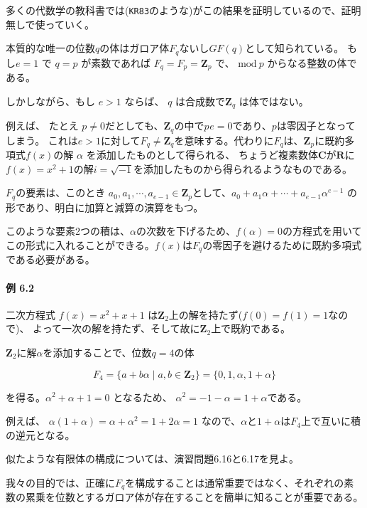 \documentclass[12pt,a4paper]{article}
\begin{document}
多くの代数学の教科書では(\texttt{KR83}のような)がこの結果を証明しているので、証明無しで使っていく。

本質的な唯一の位数$q$の体はガロア体$F_q$ないし$GF(q)$として知られている。
もし$ e = 1 $ で $q = p$ が素数であれば
$F_q = F_p = \mathbf{Z}_p$ で、 $\text{mod} \  p$
からなる整数の体である。

しかしながら、もし $e > 1$ ならば、 $q$
は合成数で$\mathbf{Z}_q$ は体ではない。

例えば、 たとえ $p \neq 0
$だとしても、$\mathbf{Z}_q$の中で$p^{}e =
0$であり、$p$は零因子となってしまう。 これは$e >
1$に対して$F_q
\neq \mathbf{Z}_q$を意味する。代わりに$F_q$は、$\mathbf{Z}_p$に既約多項式$f(x)$の解
$\alpha$ を添加したものとして得られる、
ちょうど複素数体$\mathbf{C}$が$\mathbf{R}$に$f(x) = x^2 + 1$の解$i = \sqrt{-1}$を添加したものから得られるようなものである。

$F_q$の要素は、このとき
$a_0, a_1, \cdots , a_{e-1} \in \mathbf{Z}_p$として、$a_0 + a_1 \alpha + \cdots + a_{e-1} \alpha^{e-1}$
の形であり、明白に加算と減算の演算をもつ。

このような要素2つの積は、$\alpha$の次数を下げるため、$f(\alpha) = 0$の方程式を用いてこの形式に入れることができる。$f(x)$は$F_q$の零因子を避けるために既約多項式である必要がある。

\paragraph{例 6.2}\label{ux4f8b-6.2}

二次方程式 $f(x) = x^2 + x + 1$
は$\mathbf{Z}_2$上の解を持たず($f(0) = f(1) = 1$なので)、
よって一次の解を持たず、そして故に$\mathbf{Z}_2$上で既約である。

$\mathbf{Z}_2$に解$\alpha$を添加することで、位数$q = 4$の体

\[F_4 = \lbrace a + b\alpha \mid a,b \in \mathbf{Z}_2 \rbrace = \lbrace 0, 1, \alpha , 1 + \alpha \rbrace\]

を得る。$\alpha^2 + \alpha + 1 = 0$ となるため、
$\alpha^2 = -1 - \alpha = 1 + \alpha$である。

例えば、 $\alpha (1 + \alpha) = \alpha + \alpha^2 = 1 + 2 \alpha = 1$
なので、$\alpha$と$1 + \alpha$は$F_4$上で互いに積の逆元となる。

似たような有限体の構成については、演習問題6.16と6.17を見よ。

我々の目的では、正確に$F_q$を構成することは通常重要ではなく、それぞれの素数の累乗を位数とするガロア体が存在することを簡単に知ることが重要である。
\end{document}

